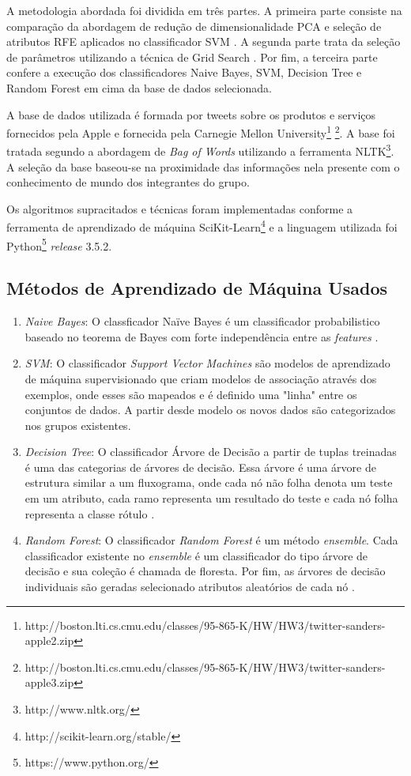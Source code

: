 A metodologia abordada foi dividida em três partes. A primeira parte consiste na comparação da abordagem de redução de dimensionalidade PCA \cite{Jolliffe:2002} e seleção de atributos RFE \cite{Guyon2003} aplicados no classificador SVM \cite{MachineLearning:Michalski:2013}. A segunda parte trata da seleção de parâmetros utilizando a técnica de Grid Search \cite{SnoekLA12}. Por fim, a terceira parte confere a execução dos classificadores Naive Bayes, SVM, Decision Tree e Random Forest \cite{MachineLearning:Michalski:2013} em cima da base de dados selecionada.

A base de dados utilizada é formada por tweets sobre os produtos e serviços fornecidos pela Apple e fornecida pela Carnegie Mellon University\footnote{http://boston.lti.cs.cmu.edu/classes/95-865-K/HW/HW3/twitter-sanders-apple2.zip} \footnote{http://boston.lti.cs.cmu.edu/classes/95-865-K/HW/HW3/twitter-sanders-apple3.zip}. A base foi tratada segundo a abordagem de \textit{Bag of Words} utilizando a ferramenta NLTK\footnote{http://www.nltk.org/}. A seleção da base baseou-se na proximidade das informações nela presente com o conhecimento de mundo dos integrantes do grupo.

Os algoritmos supracitados e técnicas foram implementadas conforme a ferramenta de aprendizado de máquina SciKit-Learn\footnote{http://scikit-learn.org/stable/} e a linguagem utilizada foi Python\footnote{https://www.python.org/} \textit{release} 3.5.2.

\subsection{Métodos de Aprendizado de Máquina Usados}
\begin{enumerate}
	\item \textit{Naive Bayes}: O classficador Naïve Bayes é um classificador probabilistico baseado no teorema de Bayes com forte independência entre as \textit{features} \cite{Han2005}.
	\item \textit{SVM}: O classificador \textit{Support Vector Machines} são modelos de aprendizado de máquina supervisionado que criam modelos de associação através dos exemplos, onde esses são mapeados e é definido uma "linha" entre os conjuntos de dados. A partir desde modelo os novos dados são categorizados nos grupos existentes.
	\item \textit{Decision Tree}: O classificador Árvore de Decisão a partir de tuplas treinadas é uma das categorias de árvores de decisão. Essa árvore é uma árvore de estrutura similar a um fluxograma, onde cada nó não folha denota um teste em um atributo, cada ramo representa um resultado do teste e cada nó folha representa a classe rótulo \cite{Han2005}.
	\item \textit{Random Forest}: O classificador \textit{Random Forest} é um método \textit{ensemble}. Cada classificador existente no \textit{ensemble} é um classificador do tipo árvore de decisão e sua coleção é chamada de floresta. Por fim, as árvores de decisão individuais são geradas selecionado atributos aleatórios de cada nó \cite{Han2005}.
	
\end{enumerate}
